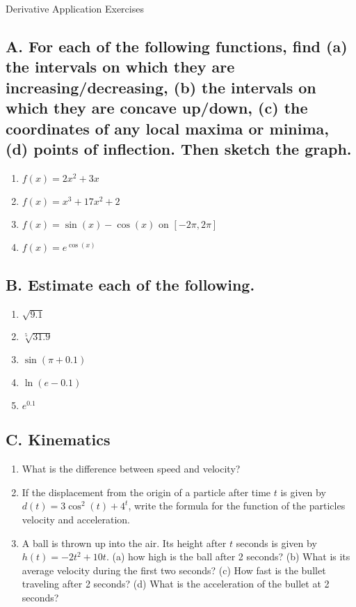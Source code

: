 \documentclass{article}
\begin{document}
\begin{center}
\begin{Huge}Derivative Application Exercises\end{Huge}
\end{center}


\subsection*{A. For each of the following functions, find (a) the intervals on which they are increasing/decreasing, (b) the intervals on which they are concave up/down, (c) the coordinates of any local maxima or minima, (d) points of inflection. Then sketch the graph.}

\begin{multicols}{2}
\begin{enumerate}
\item $f(x)=2x^2+3x$
\item $f(x)=x^3+17x^2+2$
\item $f(x)=\sin(x) - \cos(x)$ on $[-2\pi,2\pi]$
\item $f(x)=e^{\cos(x)}$
\end{enumerate}
\end{multicols}

\subsection*{B. Estimate each of the following.}

\begin{multicols}{5}
\begin{enumerate}
\item $\sqrt{9.1}$
\item $\sqrt[5]{31.9}$
\item $\sin(\pi + 0.1)$
\item $\ln(e-0.1)$
\item $e^{0.1}$
\end{enumerate}
\end{multicols}


\subsection*{C. Kinematics}
\begin{enumerate}
\item What is the difference between speed and velocity?
\item If the displacement from the origin of a particle after time $t$ is given by $d(t)=3\cos^2(t) + 4^t$, write the formula for the function of the particles velocity and acceleration.
\item A ball is thrown up into the air. Its height after $t$ seconds is given by $h(t)=-2t^2+10t$. (a) how high is the ball after 2 seconds? (b) What is its average velocity during the first two seconds? (c) How fast is the bullet traveling after 2 seconds? (d) What is the acceleration of the bullet at 2 seconds?
\end{enumerate}
\end{document}
